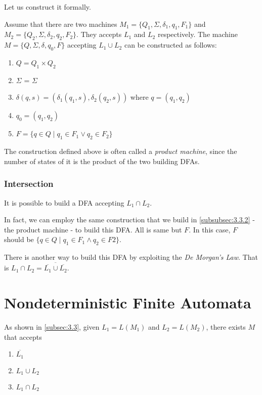\documentclass[11pt]{article}
\begin{document}
Let us construct it formally.
\begin{definition}
Assume that there are two machines $M_1=\{Q_1,\Sigma,\delta_1,q_1,F_1\}$ and
$M_2 = \{Q_2, \Sigma,\delta_2,q_2,F_2\}$. They accepts $L_1$ and $L_2$ respectively.
The machine $M = \{Q,\Sigma,\delta,q_0,F\}$ accepting $L_1 \cup L_2$ can be
constructed as follows:
\begin{enumerate}
\item $Q = Q_1 \times Q_2$
\item $\Sigma$ = $\Sigma$
\item $\delta(q, s) = (\delta_1(q_1, s), \delta_2(q_2, s))$ where $q = (q_1, q_2)$
\item $q_0 = (q_1, q_2)$
\item $F = \{q \in Q \mid q_1 \in F_1 \vee q_2 \in F_2\}$
\end{enumerate}
\end{definition}

The construction defined above is often called a \emph{product machine}, since the
number of states of it is the product of the two building DFAs.

\subsubsection{Intersection}

It is possible to build a DFA accepting $L_1 \cap L_2$.

In fact, we can employ the same construction that we build in \ref{subsubsec:3.3.2}
- the product machine - to build this DFA. All is same but $F$. In this case, $F$
should be $\{q \in Q \mid q_1 \in F_1 \wedge q_2 \in F2\}$.

There is another way to build this DFA by exploiting the \emph{De Morgan's Law}.
That is $L_1 \cap L_2 = \overline{\overline{L_1} \cup \overline{L_2}}$.

\section{Nondeterministic Finite Automata}

As shown in \ref{subsec:3.3}, given $L_1 = L(M_1)$ and $L_2 = L(M_2)$, there exists
$M$ that accepts
\begin{enumerate}
\item $\overline{L_1}$
\item $L_1 \cup L_2$
\item $L_1 \cap L_2$
\end{enumerate}
\end{document}
